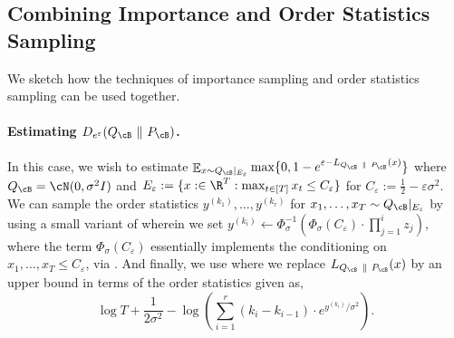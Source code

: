 \documentclass[twoside]{article}
\theoremstyle{definition}
\DeclareMathOperator*{\Ex}{\mathbb{E}}
\newcommand{\eps}{\varepsilon}
\newcommand{\prn}[1]{\left ( #1 \right )}
\newcommand{\Deps}{D_{e^{\eps}}}
\newcommand{\PB}{P_{\cB}}
\newcommand{\QB}{Q_{\cB}}
\begin{document}
\subsection{Combining Importance and Order Statistics Sampling}\label{subapp:importance-order-combined}

We sketch how the techniques of importance sampling and order statistics sampling can be used together.

\paragraph{\boldmath Estimating $\Deps(\QB ~\|~ \PB)$.} In this case, we wish to estimate $\Ex_{x \sim \QB |_{E_\eps}} \max\{0, 1 - e^{\eps - L_{\QB ~\|~ \PB}(x)}\}$ where $\QB = \cN(0, \sigma^2 I)$ and $E_\eps := \{x :\in \R^T : \max_{t \in [T]} x_t \le C_{\eps}\}$ for $C_\eps := \frac12 - \eps \sigma^2$. We can sample the order statistics $y^{(k_1)}, \ldots, y^{(k_r)}$ for $x_1, \ldots, x_T \sim \QB|_{E_\eps}$ by using a small variant of  wherein we set $y^{(k_i)} \gets \Phi_{\sigma}^{-1}(\Phi_\sigma(C_\eps) \cdot \prod_{j=1}^i z_j)$, where the term $\Phi_\sigma(C_\eps)$ essentially implements the conditioning on $x_1, \ldots, x_T \le C_\eps$, via . And finally, we use  where we replace $L_{\QB ~\|~ \PB}(x)$ by an upper bound in terms of the order statistics given as,
\[\textstyle
\log T + \frac{1}{2\sigma^2} - \log\prn{\sum_{i=1}^r (k_i - k_{i-1}) \cdot e^{y^{(k_i)} / \sigma^2}}.
\]
\end{document}
